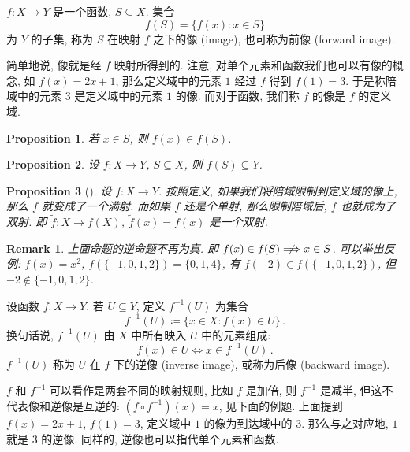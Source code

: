 \documentclass[UTF8]{ctexart}
\theoremstyle{mystyle}
\newtheorem{proposition}{Proposition}[section]
\theoremstyle{myremark}
\newtheorem*{remark}{Remark}
\theoremstyle{plain}
\newcommand{\set}[1]{\{#1\}}
\begin{document}
\begin{definition}
    $ f \colon X \to Y $ 是一个函数, $ S \subseteq X $. 集合 \[ f(S) = \set{f(x) \colon x \in S} \] 为 $ Y $ 的子集, 称为 $ S $ 在映射 $ f $ 之下的像 (image), 也可称为前像 (forward image).
\end{definition}

简单地说, 像就是经 $ f $ 映射所得到的. 注意, 对单个元素和函数我们也可以有像的概念, 如 $ f(x) = 2x + 1 $, 那么定义域中的元素 $ 1 $ 经过 $ f $ 得到 $ f(1) = 3 $. 于是称陪域中的元素 $ 3 $ 是定义域中的元素 $ 1 $ 的像. 而对于函数, 我们称 $ f $ 的像是 $ f $ 的定义域.

\begin{proposition}
    若 $ x \in S $, 则 $ f(x) \in f(S) $.
\end{proposition}

\begin{proposition}
    设 $ f \colon X \to Y $, $ S \subseteq X $, 则 $ f(S) \subseteq Y $.
\end{proposition}

\begin{proposition}[]
    设 $ f \colon X \to Y $. 按照定义, 如果我们将陪域限制到定义域的像上, 那么 $ f $ 就变成了一个满射. 而如果 $ f $ 还是个单射, 那么限制陪域后, $ f $ 也就成为了双射. 即 $ \widetilde{f} \colon X \to f(X) $, $ \widetilde{f}(x) = f(x) $ 是一个双射.
\end{proposition}

\begin{remark}
    上面命题的逆命题不再为真. 即 $ f(x) \in f(S) \centernot \Longrightarrow x \in S $. 可以举出反例: $ f(x) = x^2 $, $ f(\set{-1, 0, 1, 2}) = \set{0, 1, 4} $, 有 $ f(-2) \in f(\set{-1, 0, 1, 2}) $, 但 $ -2 \not\in \set{-1, 0, 1, 2} $.
\end{remark}

\begin{definition}[\text{逆像}]
    设函数 $ f \colon X \to Y $. 若 $ U \subseteq Y $, 定义 $ f^{-1} (U) $ 为集合 \[ f ^{-1} (U) \coloneqq \set{x \in X \colon f(x) \in U} \,.\]
    换句话说, $ f^{-1}(U) $ 由 $ X $ 中所有映入 $ U $ 中的元素组成: \[ f(x) \in U \Longleftrightarrow x \in f^{-1}(U) \,.\] $ f^{-1}(U) $ 称为 $ U $ 在 $ f $ 下的逆像 (inverse image), 或称为后像 (backward image).
\end{definition}

$ f $ 和 $ f^{-1} $ 可以看作是两套不同的映射规则, 比如 $ f $ 是加倍, 则 $ f^{-1} $ 是减半, 但这不代表像和逆像是互逆的: $ (f \circ f^{-1})(x) = x $, 见下面的例题. 上面提到 $ f(x) = 2 x + 1 $, $ f(1) = 3 $, 定义域中 $ 1 $ 的像为到达域中的 $ 3 $. 那么与之对应地, $ 1 $ 就是 $ 3 $ 的逆像. 同样的, 逆像也可以指代单个元素和函数.
\end{document}
